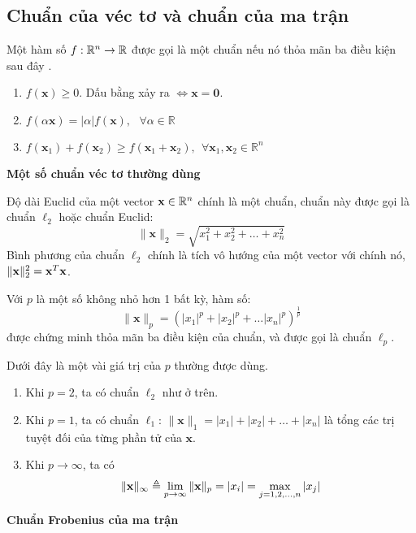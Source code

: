 \subsection{Chuẩn của véc tơ và chuẩn của ma trận}
Một hàm số $f: \mathbb{R}^n \rightarrow \mathbb{R}$ được gọi là một chuẩn nếu nó thỏa mãn ba
điều kiện sau đây \cite{1}.
\begin{enumerate}
	
	\item $f(\mathbf{x}) \geq 0$. Dấu bằng xảy ra $\Leftrightarrow \mathbf{x = 0} $.
	
	\item $f(\alpha \mathbf{x}) = |\alpha| f(\mathbf{x}), ~~~\forall \alpha \in \mathbb{R}\ $
	
	\item $f(\mathbf{x}_1) + f(\mathbf{x}_2) \geq f(\mathbf{x}_1 + \mathbf{x}_2),
	~~\forall \mathbf{x}_1, \mathbf{x}_2 \in \mathbb{R}^n$
	
\end{enumerate}
\textbf{Một số chuẩn véc tơ thường dùng}

Độ dài Euclid của một vector $\mathbf{x} \in \mathbb{R}^n$ chính là một chuẩn, chuẩn này
được gọi là chuẩn $\ell_2$ hoặc chuẩn Euclid:
\begin{equation}
\label{eqn:norm2}
\|\mathbf{x}\|_2 = \sqrt{x_1^2 + x_2^2 + \dots + x_n^2}
\end{equation}
Bình phương của chuẩn $\ell_2$ chính là tích vô hướng của một vector với chính nó,
$\|\mathbf{x}\|_2^2 = \mathbf{x}^T\mathbf{x}$.

Với $p$ {là một số không nhỏ hơn 1} bất kỳ, hàm số:
\begin{equation}
\label{eqn:normp}
\|\mathbf{x}\|_p = (|x_1|^p + |x_2|^p + \dots |x_n|^p)^{\frac{1}{p}}
\end{equation}
được chứng minh thỏa mãn ba điều kiện của chuẩn, và được gọi là {chuẩn $\ell_p$}.

Dưới đây là một vài giá trị của $p$ thường được dùng.
\begin{enumerate}
	\item Khi $p = 2$, ta có chuẩn $\ell_2$ như ở trên.
	
	\item Khi $p = 1$, ta có chuẩn $\ell_1$:
	$\|\mathbf{x}\|_1 = |x_1| + |x_2| + \dots +|x_n|$ là tổng các trị tuyệt đối
	của từng phần tử của $\mathbf{x}$. 
	
	\item Khi $p \rightarrow \infty $, ta có
	\begin{equation}
	\|\mathbf{x}\|_{\infty} \triangleq \lim_{p \rightarrow \infty} \|\mathbf{x}\|_{p} =
	|x_i| = \max_{j=1, 2, \dots, n} | x_j|
	\end{equation}
	
\end{enumerate}
\textbf{Chuẩn Frobenius của ma trận}

